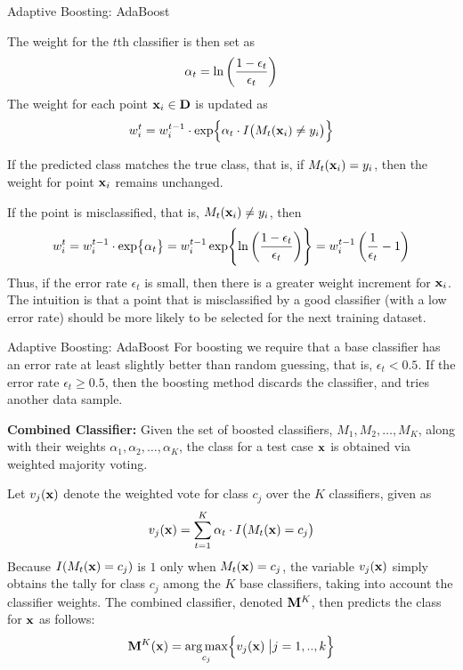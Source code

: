 \begin{frame}{Adaptive Boosting: AdaBoost}

The weight for the $t$th classif\/{i}er is then set as
\begin{align*}
  \alpha_{t} =  \ln\left( \frac{1-\epsilon_{t}}{\epsilon_{t}}\right)
\end{align*}
The weight for each point $\mathbf{x}_i \in \mathbf{D}$ is updated as
\begin{align*}
  w^{t}_i = w^{t-1}_i \cdot \exp \Bigl\{ \alpha_{t} \cdot
  I\bigl(M_t(\mathbf{x}_i) \ne y_i\bigr) \Bigr\}
\end{align*}

\medskip
If the predicted class matches the true class, that is, if
$M_{t}(\mathbf{x}_i) = y_i$, then  the
weight for point $\mathbf{x}_i$ remains unchanged. 

\medskip
If
the point is misclassif\/{i}ed, that is, $M_t(\mathbf{x}_i) \ne y_i$, then \begin{align*}
  w^{t}_i = w^{t-1}_i \cdot \exp \bigl\{ \alpha_{t} \bigr\}  =
  w^{t-1}_i \exp \Biggl\{
    \ln \left( \frac{1-\epsilon_{t}}{\epsilon_{t}}\right)
  \Biggr\}
  = w^{t-1}_i \left({1 \over \epsilon_{t}} -1\right)
\end{align*}
Thus, if the error rate $\epsilon_{t}$ is small,
then there is a greater weight increment for $\mathbf{x}_i$. 
The
intuition is that a point that is misclassif\/{i}ed by a good
classif\/{i}er (with a low error rate) should be more likely to be
selected for the next training dataset. 
\end{frame}



\begin{frame}{Adaptive Boosting: AdaBoost}
For boosting
we require that a base classif\/{i}er has an error
rate at least slightly better than random guessing, that is,
$\epsilon_{t} < 0.5$.  
If the error rate $\epsilon_t \ge 0.5$,
then the boosting method discards the classif\/{i}er, and tries 
another data sample.

\medskip
{\bf Combined Classifier:}
Given the set of boosted classif\/{i}ers, $M_1, M_2, \ldots, M_K$,
along with their weights $\alpha_1, \alpha_2, \ldots, \alpha_K$,
the class for a test case $\mathbf{x}$ is
obtained via weighted majority voting.

\medskip
Let $v_{j}(\mathbf{x})$ denote the
weighted vote for class $c_{j}$ over the $K$ classif\/{i}ers, given as
\begin{align*}
  v_{j}(\mathbf{x}) = \sum_{t=1}^K \alpha_t \cdot I\bigl(M_t(\mathbf{x})= c_{j}\bigr)
\end{align*}
Because $I(M_t(\mathbf{x}) = c_{j})$ is $1$ only when $M_t(\mathbf{x}) = c_{j}$, the
variable $v_{j}(\mathbf{x})$ simply obtains the tally for class $c_{j}$ among
the $K$ base classif\/{i}ers, taking into account the classif\/{i}er
weights. The combined classif\/{i}er, denoted $\mathbf{M}^K$, then predicts
the class for $\mathbf{x}$ as follows:
\begin{align*}
  \mathbf{M}^K(\mathbf{x}) = \mathop{\arg\max}_{c_{j}} \Bigl\{ v_{j}(\mathbf{x}) \;\bigl| j=1,..,k \Bigr\}
\end{align*}
\end{frame}




